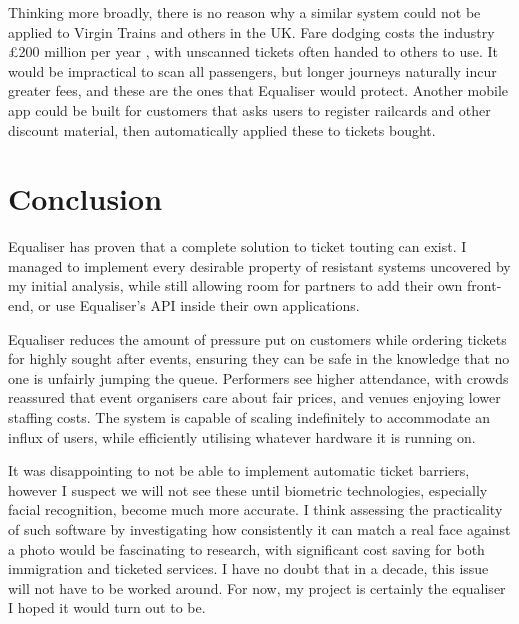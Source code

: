 \documentclass[12pt,a4paper]{bhamdissertation}
\begin{document}
Thinking more broadly, there is no reason why a similar system could not be applied to Virgin Trains and others in the UK. Fare dodging costs the industry £200 million per year \cite{BM16}, with unscanned tickets often handed to others to use. It would be impractical to scan all passengers, but longer journeys naturally incur greater fees, and these are the ones that Equaliser would protect. Another mobile app could be built for customers that asks users to register railcards and other discount material, then automatically applied these to tickets bought.

\chapter{Conclusion}

Equaliser has proven that a complete solution to ticket touting can exist. I managed to implement every desirable property of resistant systems uncovered by my initial analysis, while still allowing room for partners to add their own front-end, or use Equaliser's API inside their own applications.

Equaliser reduces the amount of pressure put on customers while ordering tickets for highly sought after events, ensuring they can be safe in the knowledge that no one is unfairly jumping the queue. Performers see higher attendance, with crowds reassured that event organisers care about fair prices, and venues enjoying lower staffing costs. The system is capable of scaling indefinitely to accommodate an influx of users, while efficiently utilising whatever hardware it is running on.

It was disappointing to not be able to implement automatic ticket barriers, however I suspect we will not see these until biometric technologies, especially facial recognition, become much more accurate. I think assessing the practicality of such software by investigating how consistently it can match a real face against a photo would be fascinating to research, with significant cost saving for both immigration and ticketed services. I have no doubt that in a decade, this issue will not have to be worked around. For now, my project is certainly the equaliser I hoped it would turn out to be.
\end{document}
